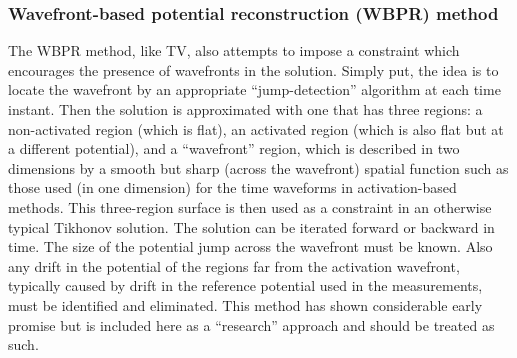 \subsubsection{Wavefront-based potential reconstruction (WBPR) method}

The WBPR method, like TV, also attempts to impose a constraint which
encourages the presence of wavefronts in the solution. Simply put, the idea
is to locate the wavefront by an appropriate ``jump-detection'' algorithm at each time instant.
Then the solution is approximated with one that has three regions: a non-activated region (which is flat), an
activated region (which is also flat but at a different potential), and a
``wavefront'' region, which is described in two dimensions by a smooth but
sharp (across the wavefront) spatial function such as those used (in one
dimension) for the time waveforms in activation-based methods. This
three-region surface is then used as a constraint in an otherwise typical
Tikhonov solution. The solution can be iterated forward or backward in
time.
The size of the potential jump across the wavefront must be known.
Also any drift in the potential of the regions far from the
activation wavefront, typically caused by drift in the reference potential
used in the measurements, must be identified and eliminated. This method has
shown considerable early promise but is included here as a ``research''
approach and should be treated as such.
